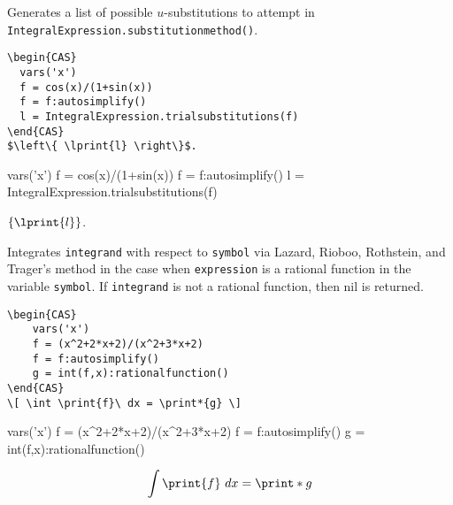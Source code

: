 
Generates a list of possible $u$-substitutions to attempt in \texttt{IntegralExpression.substitutionmethod()}.

\begin{codebox}
    \begin{verbatim}
\begin{CAS}
  vars('x')
  f = cos(x)/(1+sin(x))
  f = f:autosimplify()
  l = IntegralExpression.trialsubstitutions(f)
\end{CAS}
$\left\{ \lprint{l} \right\}$.
\end{verbatim}
\tcblower
\begin{CAS}
    vars('x')
    f = cos(x)/(1+sin(x))
    f = f:autosimplify()
    l = IntegralExpression.trialsubstitutions(f)
\end{CAS}
$ \left\{ \lprint{l} \right\}$.
\end{codebox}



Integrates \texttt{integrand} with respect to \texttt{symbol} via Lazard, Rioboo, Rothstein, and Trager's method in the case when \texttt{expression} is a rational function in the variable \texttt{symbol}. If \texttt{integrand} is not a rational function, then nil is returned.

\begin{codebox}
    \begin{verbatim}
\begin{CAS}
    vars('x')
    f = (x^2+2*x+2)/(x^2+3*x+2)
    f = f:autosimplify()
    g = int(f,x):rationalfunction()
\end{CAS}
\[ \int \print{f}\ dx = \print*{g} \]
\end{verbatim}
\tcblower
\begin{CAS}
    vars('x')
    f = (x^2+2*x+2)/(x^2+3*x+2)
    f = f:autosimplify()
    g = int(f,x):rationalfunction()
\end{CAS}
\[ \int \print{f}\ dx = \print*{g} \]
\end{codebox}

